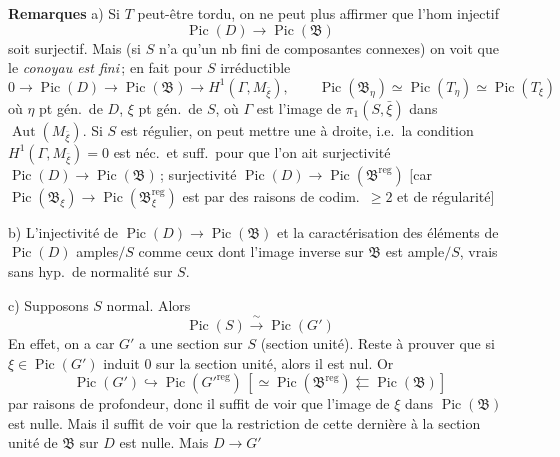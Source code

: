 \documentclass[11pt,a4paper]{article}
\begin{document}
\textbf{Remarques} a) Si $T$ peut-être tordu, on ne peut plus affirmer que
l'hom injectif
\[
  \operatorname{Pic}(D)\longrightarrow\operatorname{Pic}(\mathfrak{B})
\]
soit surjectif. Mais (si $S$ \struck{\ill{}} n'a qu'un nb fini de
composantes connexes) on voit que le \emph{conoyau est fini}\,; en fait
\ill{} \ill{} pour $S$ irréductible  
\ill{} 
\[
  0\to\operatorname{Pic}(D)\to\operatorname{Pic}(\mathfrak{B})\to
  H^1(\Gamma,M_{\bar\xi}),
  \qquad
  \operatorname{Pic}(\mathfrak{B}_\eta)\simeq\operatorname{Pic}(T_\eta)
  \simeq\operatorname{Pic}(T_\xi)
\]
où $\eta$ pt gén.\ de $D$, $\xi$ pt gén.\ de $S$, où $\Gamma$ est l'image de
$\pi_1(S,\bar\xi)$ dans $\operatorname{Aut}(M_{\bar\xi})$. Si $S$ est
régulier, \struck{\ill{}} on peut mettre une  à droite,
i.e.\ la condition $H^1(\Gamma,M_{\bar\xi})=0$ est néc.\ et suff.\ pour que
l'on ait \struck{\ill{}}  surjectivité
$\operatorname{Pic}(D)\to\operatorname{Pic}(\mathfrak{B})$\,; \struck{\ill{}}
surjectivité $\operatorname{Pic}(D)\to
\operatorname{Pic}(\mathfrak{B}^{\mathrm{reg}})$
[car $\operatorname{Pic}(\mathfrak{B}_\xi)\to
\operatorname{Pic}(\mathfrak{B}_\xi^{\mathrm{reg}})$ est 
  par des raisons de codim.\ $\geqslant 2$
et de régularité]

b) L'injectivité de $\operatorname{Pic}(D)\to\operatorname{Pic}(\mathfrak{B})$
et la caractérisation des éléments de $\operatorname{Pic}(D)$ amples$/S$
comme ceux dont l'image inverse sur $\mathfrak{B}$ est ample$/S$,
\struck{\ill{}}  vrais sans hyp.\ de normalité sur $S$.

c) Supposons $S$ normal. Alors
\[
  \operatorname{Pic}(S)\xrightarrow{\ \sim\ }\operatorname{Pic}(G')
\]
En effet, on  a
 car $G'$ a une section sur $S$ (section unité). Reste
à prouver que si $\xi\in\operatorname{Pic}(G')$ induit $0$ sur la section
unité, alors il est nul. Or
\[
  \operatorname{Pic}(G')\hookrightarrow
  \operatorname{Pic}(G'^{\mathrm{reg}})\,[\simeq
  \operatorname{Pic}(\mathfrak{B}^{\mathrm{reg}})\leftleftarrows
  \operatorname{Pic}(\mathfrak{B})]
\]
 par raisons de profondeur, donc il suffit de voir que
l'image  de $\xi$ dans $\operatorname{Pic}(\mathfrak{B})$ est
nulle. Mais il suffit de voir que la restriction de cette dernière à la
section unité de $\mathfrak{B}$ sur $D$ est nulle. Mais $D\to G'$
\end{document}
